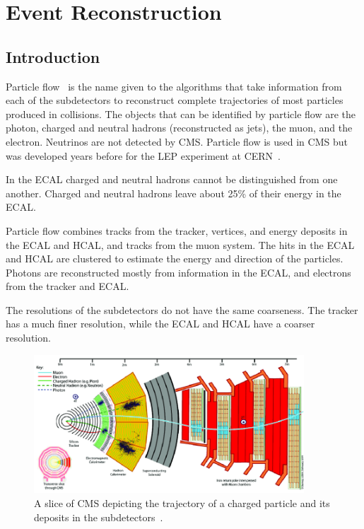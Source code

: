 \chapter{Event Reconstruction}\label{chap:pflow}



\section{Introduction}
\label{sec:ch4:intro}

Particle flow~\cite{particleflow} is the name given to the algorithms that take information from each of the subdetectors to reconstruct complete trajectories of most particles produced in collisions. The objects that can be identified by particle flow are the photon, charged and neutral hadrons (reconstructed as jets), the muon, and the electron. Neutrinos are not detected by CMS. Particle flow is used in CMS but was developed years before for the LEP experiment at CERN~\cite{particleflow2}.

In the ECAL charged and neutral hadrons cannot be distinguished from one another. Charged and neutral hadrons leave about 25\% of their energy in the ECAL.


Particle flow combines tracks from the tracker, vertices, and energy deposits in the ECAL and HCAL, and tracks from the muon system. The hits in the ECAL and HCAL are clustered to estimate the energy and direction of the particles. Photons are reconstructed mostly from information in the ECAL, and electrons from the tracker and ECAL. 

The resolutions of the subdetectors do not have the same coarseness. The tracker has a much finer resolution, while the ECAL and HCAL have a coarser resolution.

 \begin{figure}[h]
\centering
\includegraphics[width=0.9\textwidth]{figures/cms_slice}
\caption{A slice of CMS depicting the trajectory of a charged particle and its deposits in the subdetectors~\cite{particleflow}.}
\label{fig:cms_slice}
\end{figure}

